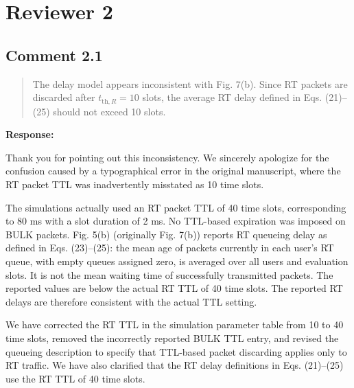 \documentclass[11pt,a4paper]{article}
\begin{document}
\clearpage\section*{Reviewer 2}

\subsection*{Comment 2.1}

\begin{quote}\small The delay model appears inconsistent with Fig. 7(b). Since RT packets are discarded after $t_{\mathrm{th},R}=10$ slots, the average RT delay defined in Eqs. (21)--(25) should not exceed 10 slots.\end{quote}

\textbf{Response:}\par

Thank you for pointing out this inconsistency. We sincerely apologize for the confusion caused by a typographical error in the original manuscript, where the RT packet TTL was inadvertently misstated as 10 time slots.
\par

The simulations actually used an RT packet TTL of 40 time slots, corresponding to 80 ms with a slot duration of 2 ms. No TTL-based expiration was imposed on BULK packets. Fig. 5(b) (originally Fig. 7(b)) reports RT queueing delay as defined in Eqs. (23)--(25): the mean age of packets currently in each user's RT queue, with empty queues assigned zero, is averaged over all users and evaluation slots. It is not the mean waiting time of successfully transmitted packets. The reported values are below the actual RT TTL of 40 time slots. The reported RT delays are therefore consistent with the actual TTL setting.
\par

We have corrected the RT TTL in the simulation parameter table from 10 to 40 time slots, removed the incorrectly reported BULK TTL entry, and revised the queueing description to specify that TTL-based packet discarding applies only to RT traffic. We have also clarified that the RT delay definitions in Eqs. (21)--(25) use the RT TTL of 40 time slots.
\par

\end{document}
